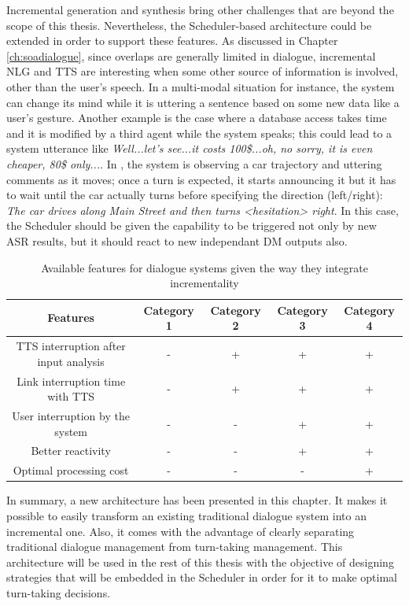              Incremental generation and synthesis \cite{Baumann2013} bring other challenges that are beyond the scope of this thesis. Nevertheless, the Scheduler-based architecture could be extended in order to support these features. As discussed in Chapter \ref{ch:soadialogue}, since overlaps are generally limited in dialogue, incremental NLG and TTS are interesting when some other source of information is involved, other than the user's speech. In a multi-modal situation for instance, the system can change its mind while it is uttering a sentence based on some new data like a user's gesture. Another example is the case where a database access takes time and it is modified by a third agent while the system speaks; this could lead to a system utterance like \textit{Well...let's see...it costs 100\$...oh, no sorry, it is even cheaper, 80\$ only...}. In \cite{Baumann2013}, the system is observing a car trajectory and uttering comments as it moves; once a turn is expected, it starts announcing it but it has to wait until the car actually turns before specifying the direction (left/right): \textit{The car drives along Main Street and then turns <hesitation> right}. In this case, the Scheduler should be given the capability to be triggered not only by new ASR results, but it should react to new independant DM outputs also.

             \begin{table}[htp]
      	     \footnotesize
             \centering
             \begin{tabular}{|c|c|c|c|c|}
               \hline
               \textbf{Features}	& \textbf{Category 1} & \textbf{Category 2} & \textbf{Category 3} & \textbf{Category 4} \\
               \hline
               TTS interruption after input analysis & - & + & + & + \\
               \hline
               Link interruption time with TTS & - & + & + & + \\
               \hline
               User interruption by the system & - & - & + & + \\
               \hline
               Better reactivity & - & - & + & + \\
               \hline
               Optimal processing cost & - & - & - & + \\
               \hline
             \end{tabular}
             \caption{Available features for dialogue systems given the way they integrate incrementality}
             \label{tab:incrclassif}
             \end{table}

             In summary, a new architecture has been presented in this chapter. It makes it possible to easily transform an existing traditional dialogue system into an incremental one. Also, it comes with the advantage of clearly separating traditional dialogue management from turn-taking management. This architecture will be used in the rest of this thesis with the objective of designing strategies that will be embedded in the Scheduler in order for it to make optimal turn-taking decisions.
